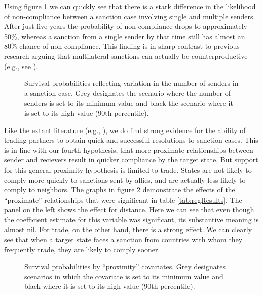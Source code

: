 Using figure \ref{fig:surv1} we can quickly see that there is a stark difference in the likelihood of non-compliance between a sanction case involving single and multiple senders. After just five years the probability of non-compliance drops to approximately 50\%, whereas a sanction from a single sender by that time still has almost an 80\% chance of non-compliance. This finding is in sharp contrast to previous research arguing that multilateral sanctions can actually be counterproductive (e.g., see \citealp{drezner2000bargaining}).

\begin{figure}[ht]
	\centering
	\caption{Survival probabilities reflecting variation in the number of senders in a sanction case. Grey designates the scenario where the number of senders is set to its minimum value and black the scenario where it is set to its high value (90th percentile).}
	\resizebox{0.7\textwidth}{!}{}
	\label{fig:surv1}
\end{figure}
\FloatBarrier

Like the extant literature (e.g., \citealp{mclean2010friends}), we do find strong evidence for the ability of trading partners to obtain quick and successful resolutions to sanction cases. This is in line with our fourth hypothesis, that more proximate relationships between sender and recievers result in quicker compliance by the target state. But support for this general proximity hypothesis is limited to trade. States are not likely to comply more quickly to sanctions sent by allies, and are actually less likely to comply to neighbors. The graphs in figure \ref{fig:surv2} demonstrate the effects of the ``proximate'' relationships that were significant in table \ref{tab:regResults}. The panel on the left shows the effect for distance. Here we can see that even though the coefficient estimate for this variable was significant, its substantive meaning is almost nil. For trade, on the other hand, there is a strong effect. We can clearly see that when a target state faces a sanction from countries with whom they frequently trade, they are likely to comply sooner.

\begin{figure}[ht]
	\centering
	\caption{Survival probabilities by ``proximity'' covariates. Grey designates scenarios in which the covariate is set to its minimum value and black where it is set to its high value (90th percentile).}
	\resizebox{1\textwidth}{!}{}	
	\label{fig:surv2}
\end{figure}
\FloatBarrier

